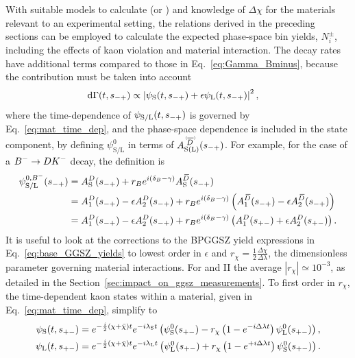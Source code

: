 With suitable models to calculate \ADorDbSL (or \ADorDbonetwo) and knowledge of $\Delta\chi$ for the materials relevant to an experimental setting, the relations derived in the preceding sections can be employed to calculate the expected phase-space bin yields, $N^\pm_i$, including the effects of kaon \CP violation and material interaction. The decay rates have additional terms compared to those in Eq.~\eqref{eq:Gamma_Bminus}, because the \KL contribution must be taken into account
\begin{align}\label{eq:Gamma_with_KL_and_phsp}
    \text{d} \Gamma(t, s_{-+}) &\propto \left|\psi_\text{S}(t, s_{-+}) + \epsilon \psi_\text{L}(t, s_{-+})\right|^2,
\end{align}
where the time-dependence of $\psi_{\text{S/L}}(t, s_{-+})$ is governed by Eq.~\eqref{eq:mat_time_dep}, and the phase-space dependence is included in the state component, by defining $\psi_{\text{S/L}}^0$ in terms of $\ADorDbSL(\smp)$. For example, for the case of a ${{{B}^-}}\rightarrow{\ensuremath{D}}{\ensuremath{{K}^-}}$ decay, the definition is
\begin{align}
\begin{split}\label{eq:state_def}
  \psi_\text{S/L}^{0, {{{B}^-}}}(s_{-+}) &= A_{\rm S}^{D}(s_{-+}) + r_B e^{i(\delta_B-\gamma)}A_{\rm S}^{{\kern 0.18em\overline{\kern -0.18em D}}}(s_{-+}) \\
  &= A^{D}_1(s_{-+}) - \epsilon A^{D}_2(s_{-+}) + r_B e^{i(\delta_B-\gamma)}\left(A^{{\kern 0.18em\overline{\kern -0.18em D}}}_1(s_{-+}) - \epsilon A^{{\kern 0.18em\overline{\kern -0.18em D}}}_2(s_{-+})\right) \\
  &= A^{D}_1(s_{-+}) - \epsilon A^{D}_2(s_{-+}) + r_B e^{i(\delta_B-\gamma)}\left(A^{D}_1(s_{+-}) + \epsilon A^{D}_2(s_{+-})\right).
\end{split}
\end{align}
It is useful to look at the corrections to the BPGGSZ yield expressions in Eq.~\eqref{eq:base_GGSZ_yields} to lowest order in $\epsilon$ and $r_\chi=\frac{1}{2}\frac{\Delta \chi}{\Delta \lambda}$, the dimensionless parameter governing material interactions. For \lhcb and \belle II the average $|r_\chi|\simeq10^{-3}$, as detailed in the Section~\ref{sec:impact_on_ggsz_measurements}.  To first order in $r_\chi$, the time-dependent kaon states within a material, given in Eq.~\eqref{eq:mat_time_dep}, simplify to~\cite{fetscherRegenerationArbitraryCoherent1996}
\begin{align}
\begin{split}
        \psi_\text{S}(t, s_{+-}) &= e^{-\frac{i}{2}(\chi + \bar \chi)t}e^{-i \lambda_{\rm S}t}\left( \psi^0_{\rm S}(s_{+-})
        -r_\chi\left(1-e^{-i\Delta\lambda t} \right)\psi^0_{\rm L}(s_{+-})\right), \\
    \psi_\text{L}(t, s_{+-}) &= e^{-\frac{i}{2}(\chi + \bar \chi)t}e^{-i \lambda_{\rm L}t}\left( \psi^0_{\rm L}(s_{+-})  
        +r_\chi\left(1-e^{+i\Delta\lambda t}\right)\psi^0_{\rm S}(s_{+-})\right).
\end{split}
\end{align}
